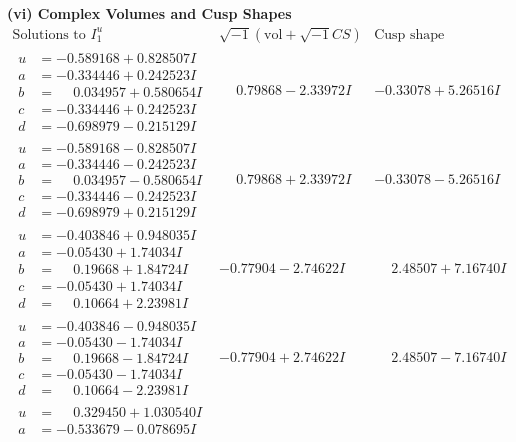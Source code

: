 \documentclass[1p]{elsarticle_modified}
\theoremstyle{definition}
\newcommand{\I}{\sqrt{-1}}
\begin{document}
\newpage\flushleft \textbf{(vi) Complex Volumes and Cusp Shapes}
$$\begin{array}{c|c|c}  
\text{Solutions to }I^u_{1}& \I (\text{vol} + \sqrt{-1}CS) & \text{Cusp shape}\\
 \hline 
\begin{aligned}
u &= -0.589168 + 0.828507 I \\
a &= -0.334446 + 0.242523 I \\
b &= \phantom{-}0.034957 + 0.580654 I \\
c &= -0.334446 + 0.242523 I \\
d &= -0.698979 - 0.215129 I\end{aligned}
 & \phantom{-}0.79868 - 2.33972 I & -0.33078 + 5.26516 I \\ \hline\begin{aligned}
u &= -0.589168 - 0.828507 I \\
a &= -0.334446 - 0.242523 I \\
b &= \phantom{-}0.034957 - 0.580654 I \\
c &= -0.334446 - 0.242523 I \\
d &= -0.698979 + 0.215129 I\end{aligned}
 & \phantom{-}0.79868 + 2.33972 I & -0.33078 - 5.26516 I \\ \hline\begin{aligned}
u &= -0.403846 + 0.948035 I \\
a &= -0.05430 + 1.74034 I \\
b &= \phantom{-}0.19668 + 1.84724 I \\
c &= -0.05430 + 1.74034 I \\
d &= \phantom{-}0.10664 + 2.23981 I\end{aligned}
 & -0.77904 - 2.74622 I & \phantom{-}2.48507 + 7.16740 I \\ \hline\begin{aligned}
u &= -0.403846 - 0.948035 I \\
a &= -0.05430 - 1.74034 I \\
b &= \phantom{-}0.19668 - 1.84724 I \\
c &= -0.05430 - 1.74034 I \\
d &= \phantom{-}0.10664 - 2.23981 I\end{aligned}
 & -0.77904 + 2.74622 I & \phantom{-}2.48507 - 7.16740 I \\ \hline\begin{aligned}
u &= \phantom{-}0.329450 + 1.030540 I \\
a &= -0.533679 - 0.078695 I \\

\end{aligned}
\end{array}$$
\end{document}
